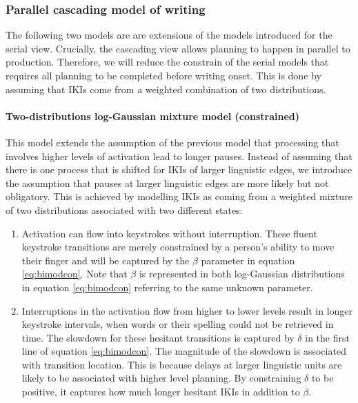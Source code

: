\begin{appendix}
\hypertarget{parallel-cascading-model-of-writing}{%
\subsubsection{Parallel cascading model of
writing}\label{parallel-cascading-model-of-writing}}

The following two models are are extensions of the models introduced for
the serial view. Crucially, the cascading view allows planning to happen
in parallel to production. Therefore, we will reduce the constrain of
the serial models that requires all planning to be completed before
writing onset. This is done by assuming that IKIs come from a weighted
combination of two distributions.

\hypertarget{two-distributions-log-gaussian-mixture-model-constrained}{%
\paragraph{Two-distributions log-Gaussian mixture model
(constrained)}\label{two-distributions-log-gaussian-mixture-model-constrained}}

This model extends the assumption of the previous model that processing
that involves higher levels of activation lead to longer pauses. Instead
of assuming that there is one process that is shifted for IKIs of larger
linguistic edges, we introduce the assumption that pauses at larger
linguistic edges are more likely but not obligatory. This is achieved by
modelling IKIs as coming from a weighted mixture of two distributions
associated with two different states:

\begin{enumerate}
\def\labelenumi{\arabic{enumi}.}
\item
  Activation can flow into keystrokes without interruption. These fluent
  keystroke transitions are merely constrained by a person's ability to
  move their finger and will be captured by the \(\beta\) parameter in
  equation \ref{eq:bimodcon}. Note that \(\beta\) is represented in both
  log-Gaussian distributions in equation \ref{eq:bimodcon} referring to
  the same unknown parameter.
\item
  Interruptions in the activation flow from higher to lower levels
  result in longer keystroke intervals, when words or their spelling
  could not be retrieved in time. The slowdown for these hesitant
  transitions is captured by \(\delta\) in the first line of equation
  \ref{eq:bimodcon}. The magnitude of the slowdown is associated with
  transition location. This is because delays at larger linguistic units
  are likely to be associated with higher level planning. By
  constraining \(\delta\) to be positive, it captures how much longer
  hesitant IKIs in addition to \(\beta\).
\end{enumerate}


\end{appendix}
